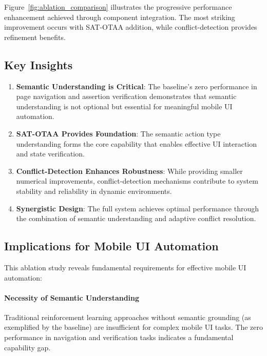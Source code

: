 Figure~\ref{fig:ablation_comparison} illustrates the progressive performance enhancement achieved through component integration. The most striking improvement occurs with SAT-OTAA addition, while conflict-detection provides refinement benefits.

\subsection{Key Insights}

\begin{enumerate}
    \item \textbf{Semantic Understanding is Critical}: The baseline's zero performance in page navigation and assertion verification demonstrates that semantic understanding is not optional but essential for meaningful mobile UI automation.
    
    \item \textbf{SAT-OTAA Provides Foundation}: The semantic action type understanding forms the core capability that enables effective UI interaction and state verification.
    
    \item \textbf{Conflict-Detection Enhances Robustness}: While providing smaller numerical improvements, conflict-detection mechanisms contribute to system stability and reliability in dynamic environments.
    
    \item \textbf{Synergistic Design}: The full system achieves optimal performance through the combination of semantic understanding and adaptive conflict resolution.
\end{enumerate}

\subsection{Implications for Mobile UI Automation}

This ablation study reveals fundamental requirements for effective mobile UI automation:

\paragraph{Necessity of Semantic Understanding} Traditional reinforcement learning approaches without semantic grounding (as exemplified by the baseline) are insufficient for complex mobile UI tasks. The zero performance in navigation and verification tasks indicates a fundamental capability gap.

